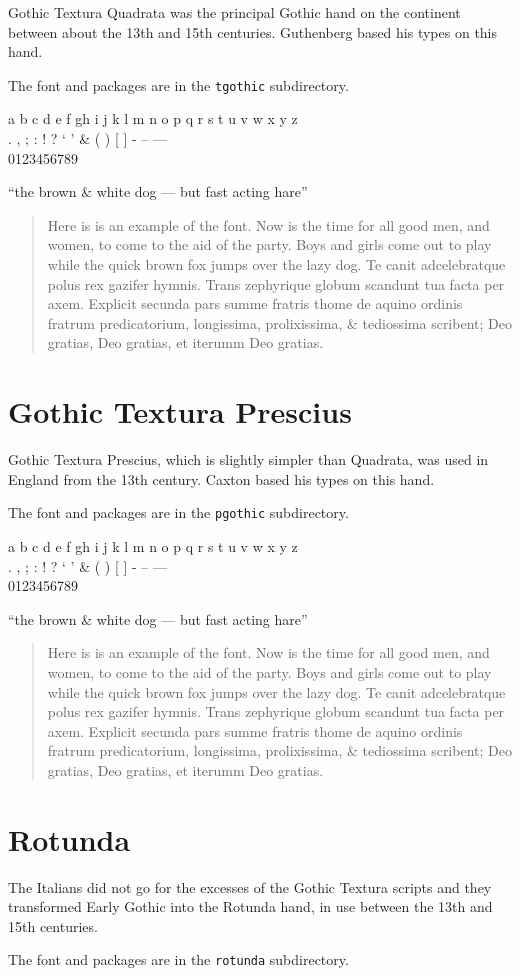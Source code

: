 \documentclass{article}
\newcommand{\abc}{a b c d e f gh i j k l m n o p q r s t u v w x y z}
\newcommand{\punct}{. , ; : ! ? ` ' \& ( ) [ ]}
\newcommand{\figs}{0123456789}
\newcommand{\dashes}{- -- ---}
\newcommand{\ligs}{``the brown \& white dog --- but fast acting hare''}
\newcommand{\sentence}{%
    now is the time for all good
men, and women, to come to the aid of the party while the quick brown fox
jumps over the lazy dog.}
\newcommand{\latin}{%
    Te canit adcelebratque polus rex gazifer hymnis.
Trans zephyrique globum scandunt tua facta per axem.
Explicit secunda pars summe fratris thome de aquino
ordinis fratrum predicatorium, longissima, prolixissima,
\& tediossima scribent; Deo gratias, Deo gratias, et iterumm
Deo gratias.
}
\renewcommand{\sentence}{%
Here is is an example of the font. Now is the time for all good
men, and women, to come to the aid of the party. Boys and girls come
out to play while the quick brown fox jumps over the lazy dog.}
\begin{document}
    Gothic Textura Quadrata was the principal Gothic hand on the continent between about
the 13th and 15th centuries. Guthenberg based his types on this hand.

    The font and packages are in the \texttt{tgothic} subdirectory.

\begin{center}
\tgothfamily
\abc \\
\punct{} \dashes \\
\figs 

\ligs\par
\end{center}

\begin{quotation}
\renewcommand{\baselinestretch}{1.3}
\tgothfamily
\sentence{} \latin \par
\end{quotation}


\clearpage
\section{Gothic Textura Prescius}

    Gothic Textura Prescius, which is slightly simpler than Quadrata, was  used in
England from the 13th century. Caxton based his types on this hand.


    The font and packages are in the \texttt{pgothic} subdirectory.

\begin{center}
\pgothfamily
\abc \\
\punct{} \dashes \\
\figs 

\ligs\par
\end{center}

\begin{quotation}
\renewcommand{\baselinestretch}{1.1}
\pgothfamily
\sentence{} \latin \par
\end{quotation}


\clearpage
\section{Rotunda}

    The Italians did not go for the excesses of the Gothic Textura scripts and
they transformed Early Gothic into the Rotunda hand, in use between the 13th and
15th centuries.

    The font and packages are in the \texttt{rotunda} subdirectory.
\end{document}
